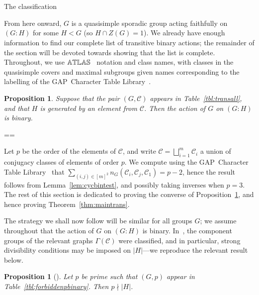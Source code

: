 \documentclass[11pt, a4paper]{amsart}
\makeatletter
\newcommand\C{\mathcal{C}}
\newcommand{\gap}{{\sf GAP}}
\let\oldsection\section
\newcommand\boldsection[1]{\oldsection{\bf #1}}
\newcommand\starsection[1]{\oldsection*{\bf #1}}
\renewcommand\section{\@ifstar\starsection\boldsection}
\newtheorem{prop}[thm]{Proposition}
\renewcommand{\proofname}{Proof}
\renewenvironment{proof}[1][\proofname]{\par
  \pushQED{\qed}  \normalfont \partopsep=\z@skip \topsep=\z@skip
  \trivlist
  \item[\hskip\labelsep
        \scshape
    #1\@addpunct{.}]\ignorespaces
}{  \popQED\endtrivlist\@endpefalse
}
\makeatother
\begin{document}
\section{The classification}\label{sec:class}

From here onward, $G$ is a quasisimple sporadic group acting faithfully on $(G:H)$ for some $H<G$ (so $H\cap Z(G) =1$). We already have enough information to find our complete list of transitive binary actions; the remainder of the section will be devoted towards showing that the list is complete. Throughout, we use $\Bbb{ATLAS}$~\cite{atlas} notation and class names, with classes in the quasisimple covers and maximal subgroups given names corresponding to the labelling of the \gap~Character Table Library~\cite{CTblLib1.3.11}.
\begin{prop}\label{prop:allbins}
    Suppose that the pair $(G,\mathcal{C})$ appears in Table~\ref{tbl:transall}, and that $H$ is generated by an element from $\mathcal{C}$. Then the action of $G$ on $(G:H)$ is binary.
\end{prop}
\begin{proof}
    Let $p$ be the order of the elements of $\mathcal{C}$, and write $\C=\bigsqcup_{i=1}^m\C_i$ a union of conjugacy classes of elements of order $p$. We compute using the \gap~Character Table Library~\cite{CTblLib1.3.11} that $\sum_{(i,j)\in[m]^2}n_G(\mathcal{C}_i,\mathcal{C}_j,\mathcal{C}_1)=p-2$, hence the result follows from Lemma~\ref{lem:cycbintest}, and possibly taking inverses when $p=3$.
\end{proof}
The rest of this section is dedicated to proving the converse of Proposition~\ref{prop:allbins}, and hence proving Theorem~\ref{thm:maintrans}.

The strategy we shall now follow will be similar for all groups $G$; we assume throughout that the action of $G$ on $(G:H)$ is binary. In~\cite{CDP}, the component groups of the relevant graphs $\Gamma(\mathcal{C})$ were classified, and in particular, strong divisibility conditions may be imposed on $|H|$---we reproduce the relevant result below.
\begin{prop}[{\cite[Corollary 1.2]{CDP}}]\label{prop:binarydiv}
Let $p$ be prime such that $(G,p)$ appear in Table~\ref{tbl:forbiddenpbinary}. Then $p\nmid |H|$.
\end{prop}
\end{document}
